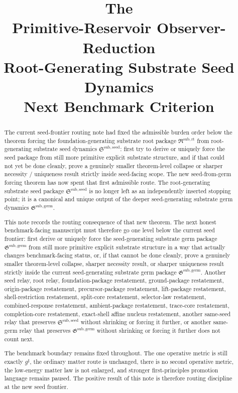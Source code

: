 \documentclass[11pt]{article}
\title{\textbf{The \TheoryName{}}\\[0.4em]
\large Primitive-Reservoir Observer-Reduction\\
\large Root-Generating Substrate Seed Dynamics\\
\large Next Benchmark Criterion}
\author{}
\date{}
\newcommand{\CompletedMetric}{g^{\sharp}}
\newcommand{\RootPackage}{\mathfrak R^{\mathrm{sub,rt}}}
\newcommand{\SeedPackage}{\mathfrak S^{\mathrm{sub,seed}}}
\newcommand{\GermPackage}{\mathfrak G^{\mathrm{sub,germ}}}
\begin{document}
\maketitle

\begin{abstract}
The current seed-frontier routing note had fixed the admissible burden order below the theorem forcing the foundation-generating substrate root package \(\RootPackage\) from root-generating substrate seed dynamics \(\SeedPackage\): first try to derive or uniquely force the seed package from still more primitive explicit substrate structure, and if that could not yet be done cleanly, prove a genuinely smaller theorem-level collapse or sharper necessity / uniqueness result strictly inside seed-facing scope. The new seed-from-germ forcing theorem has now spent that first admissible route. The root-generating substrate seed package \(\SeedPackage\) is no longer left as an independently inserted stopping point; it is a canonical and unique output of the deeper seed-generating substrate germ dynamics \(\GermPackage\).

This note records the routing consequence of that new theorem. The next honest benchmark-facing manuscript must therefore go one level below the current seed frontier: first derive or uniquely force the seed-generating substrate germ package \(\GermPackage\) from still more primitive explicit substrate structure in a way that actually changes benchmark-facing status, or, if that cannot be done cleanly, prove a genuinely smaller theorem-level collapse, sharper necessity result, or sharper uniqueness result strictly inside the current seed-generating substrate germ package \(\GermPackage\). Another seed relay, root relay, foundation-package restatement, ground-package restatement, origin-package restatement, precursor-package restatement, lift-package restatement, shell-restriction restatement, split-core restatement, selector-law restatement, combined-response restatement, ambient-package restatement, trace-core restatement, completion-core restatement, exact-shell affine nucleus restatement, another same-seed relay that preserves \(\SeedPackage\) without shrinking or forcing it further, or another same-germ relay that preserves \(\GermPackage\) without shrinking or forcing it further does not count next.

The benchmark boundary remains fixed throughout. The one operative metric is still exactly \(\CompletedMetric\), the ordinary matter route is unchanged, there is no second operative metric, the low-energy matter law is not enlarged, and stronger first-principles promotion language remains paused. The positive result of this note is therefore routing discipline at the new seed frontier.
\end{abstract}
\end{document}
